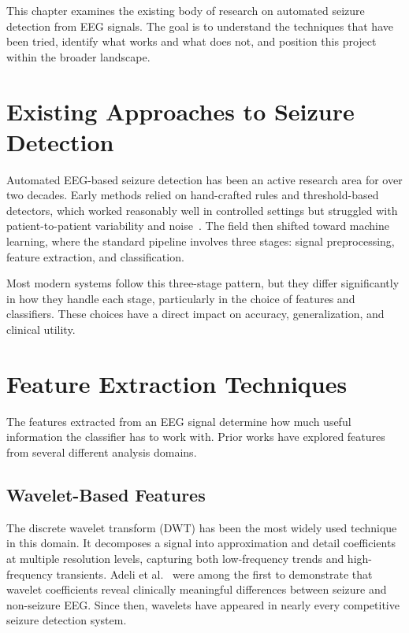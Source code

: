 
This chapter examines the existing body of research on automated seizure detection from EEG signals. The goal is to understand the techniques that have been tried, identify what works and what does not, and position this project within the broader landscape.

\section{Existing Approaches to Seizure Detection}

Automated EEG-based seizure detection has been an active research area for over two decades. Early methods relied on hand-crafted rules and threshold-based detectors, which worked reasonably well in controlled settings but struggled with patient-to-patient variability and noise~\citep{adeli2003analysis}. The field then shifted toward machine learning, where the standard pipeline involves three stages: signal preprocessing, feature extraction, and classification.

Most modern systems follow this three-stage pattern, but they differ significantly in how they handle each stage, particularly in the choice of features and classifiers. These choices have a direct impact on accuracy, generalization, and clinical utility.

\section{Feature Extraction Techniques}

The features extracted from an EEG signal determine how much useful information the classifier has to work with. Prior works have explored features from several different analysis domains.

\subsection{Wavelet-Based Features}

The discrete wavelet transform (DWT) has been the most widely used technique in this domain. It decomposes a signal into approximation and detail coefficients at multiple resolution levels, capturing both low-frequency trends and high-frequency transients. Adeli et al.~\citep{adeli2003analysis} were among the first to demonstrate that wavelet coefficients reveal clinically meaningful differences between seizure and non-seizure EEG. Since then, wavelets have appeared in nearly every competitive seizure detection system.


